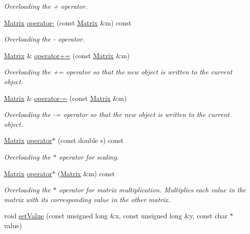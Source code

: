 \begin{DoxyCompactItemize}
\begin{DoxyCompactList}\small\item\em Overloading the + operator. \end{DoxyCompactList}\item 
\hyperlink{class_matrix}{Matrix} \hyperlink{class_matrix_a73b8da7142ea2593ba7d097651a3ce5c}{operator-\/} (const \hyperlink{class_matrix}{Matrix} \&m) const 
\begin{DoxyCompactList}\small\item\em Overloading the -\/ operator. \end{DoxyCompactList}\item 
\hyperlink{class_matrix}{Matrix} \& \hyperlink{class_matrix_a480a72298ae1fc8443b0edfaa66d7c46}{operator+=} (const \hyperlink{class_matrix}{Matrix} \&m)
\begin{DoxyCompactList}\small\item\em Overloading the += operator so that the new object is written to the current object. \end{DoxyCompactList}\item 
\hyperlink{class_matrix}{Matrix} \& \hyperlink{class_matrix_a0e459fd035b2435ea016dc93c55ccac0}{operator-\/=} (const \hyperlink{class_matrix}{Matrix} \&m)
\begin{DoxyCompactList}\small\item\em Overloading the -\/= operator so that the new object is written to the current object. \end{DoxyCompactList}\item 
\hyperlink{class_matrix}{Matrix} \hyperlink{class_matrix_a7285ecf2cfdfdcf3a3e19b4cde235528}{operator$\ast$} (const double s) const 
\begin{DoxyCompactList}\small\item\em Overloading the $\ast$ operator for scaling. \end{DoxyCompactList}\item 
\hyperlink{class_matrix}{Matrix} \hyperlink{class_matrix_a965f8987b92cfdbf8f17d3cf1bf0fa9b}{operator$\ast$} (\hyperlink{class_matrix}{Matrix} \&m) const 
\begin{DoxyCompactList}\small\item\em Overloading the $\ast$ operator for matrix multiplication. Multiplies each value in the matrix with its corresponding value in the other matrix. \end{DoxyCompactList}\item 
void \hyperlink{class_matrix_ae511e2f5874e7602fc968541efeefca1}{set\+Value} (const unsigned long \&x, const unsigned long \&y, const char $\ast$value)

\end{DoxyCompactItemize}
